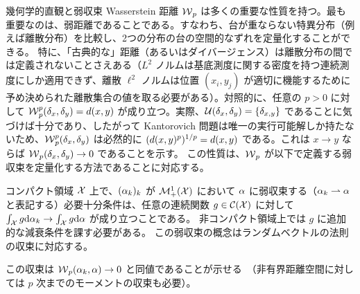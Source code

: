 \begin{rem2}{幾何学的直観と弱収束}
Wasserstein 距離 $\operatorname{\mathcal{W}}_p$ は多くの重要な性質を持つ。最も重要なのは、弱距離であることである。すなわち、台が重ならない特異分布（例えば離散分布）を比較し、2つの分布の台の空間的なずれを定量化することができる。
%
特に、「古典的な」距離（あるいはダイバージェンス）は離散分布の間では定義されないことさえある（$L^2$ ノルムは基底測度に関する密度を持つ連続測度にしか適用できず、離散 $\ell^2$ ノルムは位置 $(x_i,y_j)$ が適切に機能するために予め決められた離散集合の値を取る必要がある）。対照的に、任意の $p> 0$ に対して $\operatorname{\mathcal{W}}_p^p(\delta_x,\delta_y) = d(x,y)$ が成り立つ。実際、$\mathcal{U}(\delta_x,\delta_y)=\{ \delta_{x,y}\}$ であることに気づけば十分であり、したがって Kantorovich 問題は唯一の実行可能解しか持たないため、$\operatorname{\mathcal{W}}_p^p(\delta_x,\delta_y)$ は必然的に $(d(x,y)^p)^{1/p}=d(x,y)$ である。これは $x \rightarrow y$ ならば $\operatorname{\mathcal{W}}_p(\delta_x,\delta_y) \rightarrow 0$ であることを示す。
%
この性質は、$\operatorname{\mathcal{W}}_p$ が以下で定義する弱収束を定量化する方法であることに対応する。

\begin{defn}[弱収束]\label{dfn-weak-conv}
	コンパクト領域 $\mathcal{X}$ 上で、$(\alpha_k)_k$ が $\mathcal{M}_+^1(\mathcal{X})$ において $\alpha$ に弱収束する（$\alpha_k \rightharpoonup \alpha$ と表記する）必要十分条件は、任意の連続関数 $g \in \mathcal{C}(\mathcal{X})$ に対して $\int_{\mathcal{X}} g \mathrm{d}\alpha_k \rightarrow \int_{\mathcal{X}} g \mathrm{d}\alpha$ が成り立つことである。
	非コンパクト領域上では $g$ に追加的な減衰条件を課す必要がある。
	この弱収束の概念はランダムベクトルの法則の収束に対応する。
\end{defn}

この収束は $\operatorname{\mathcal{W}}_p(\alpha_k,\alpha) \rightarrow 0$ と同値であることが示せる~\citep[Theorem 6.8]{Villani09}（非有界距離空間に対しては $p$ 次までのモーメントの収束も必要）。
\end{rem2}


